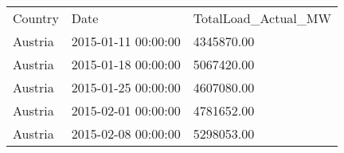 \begin{tabular}{lll}
Country & Date & TotalLoad\_Actual\_MW \\
Austria & 2015-01-11 00:00:00 & 4345870.00 \\
Austria & 2015-01-18 00:00:00 & 5067420.00 \\
Austria & 2015-01-25 00:00:00 & 4607080.00 \\
Austria & 2015-02-01 00:00:00 & 4781652.00 \\
Austria & 2015-02-08 00:00:00 & 5298053.00 \\
\end{tabular}
